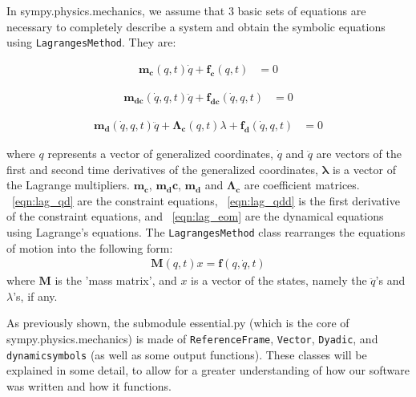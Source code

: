 \documentclass[twocolumn,10pt]{asme2e}
\begin{document}
\begin{description}
    In sympy.physics.mechanics, we assume that 3 basic sets of equations are
    necessary to completely describe a system and obtain the symbolic equations
    using \verb|LagrangesMethod|. They are:

    \label{eqn:lag_qd}
    \begin{align}
        \mathbf{m_{c}}(q, t) \dot{q} + \mathbf{f_{c}}(q, t) &= 0
    \end{align}

    \label{eqn:lag_qdd}
    \begin{align}
        \mathbf{m_{dc}}(\dot{q}, q, t) \ddot{q} + \mathbf{f_{dc}}(\dot{q}, q,
            t) &= 0
    \end{align}

    \label{eqn:lag_eom}
    \begin{align}
        \mathbf{m_d}(\dot{q}, q, t) \ddot{q} + \mathbf{\Lambda_c}(q, t)
            \lambda + \mathbf{f_d}(\dot{q}, q, t) &= 0
    \end{align}

    where $q$ represents a vector of generalized coordinates, $\dot{q}$ and
    $\ddot{q}$ are vectors of the first and second time derivatives of the
    generalized coordinates, $\mathbf{\lambda}$ is a vector of the Lagrange
    multipliers. $\mathbf{m_c}$, $\mathbf{m_dc}$, $\mathbf{m_d}$ and
    $\mathbf{\Lambda_c}$ are coefficient matrices.
    ~\ref{eqn:lag_qd} are the constraint equations, ~\ref{eqn:lag_qdd} is the
    first derivative of the constraint equations, and ~\ref{eqn:lag_eom} are
    the dynamical equations using Lagrange's equations. The
    \verb|LagrangesMethod| class rearranges the equations of motion into the
    following form:
    \label{eqn:lag_rearr}
    \begin{align}
        \mathbf{M}(q, t) x = \mathbf{f}(q, \dot{q}, t)
    \end{align}
    where $\mathbf{M}$ is the 'mass matrix', and $x$ is a vector of the states,
    namely the $\ddot{q}$'s and $\lambda$'s, if any.

\end{description}

As previously shown, the submodule essential.py (which is the core of
sympy.physics.mechanics) is made of \verb|ReferenceFrame|, \verb|Vector|,
\verb|Dyadic|, and \verb|dynamicsymbols| (as well as some output functions).
These classes will be explained in some detail, to allow for a greater
understanding of how our software was written and how it functions.
\end{document}

